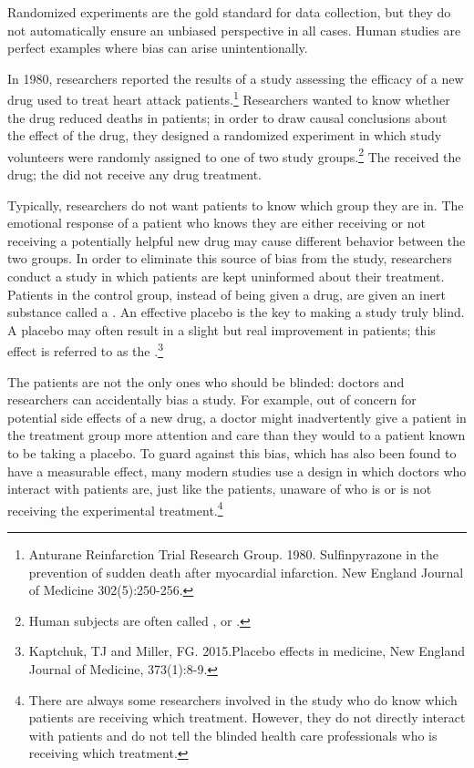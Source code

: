 \begin{doublespace}
Randomized experiments are the gold standard for data collection, but they do not automatically ensure an unbiased perspective in all cases. Human studies are perfect examples where bias can arise unintentionally. 

In 1980, researchers reported the results of a study assessing the efficacy of a new drug used to treat heart attack patients.\footnote{Anturane Reinfarction Trial Research Group. 1980. Sulfinpyrazone in the prevention of sudden death after myocardial infarction. New England Journal of Medicine 302(5):250-256.} Researchers wanted to know whether the drug reduced deaths in patients; in order to draw causal conclusions about the effect of the drug, they designed a randomized experiment in which study volunteers were randomly assigned to one of two study groups.\footnote{Human subjects are often called , or .} The  received the drug; the  did not receive any drug treatment.

Typically, researchers do not want patients to know which group they are in. The emotional response of a patient who knows they are either receiving or not receiving a potentially helpful new drug may cause different behavior between the two groups. In order to eliminate this source of bias from the study, researchers conduct a  study in which patients are kept uninformed about their treatment. Patients in the control group, instead of being given a drug, are given an inert substance called a . An effective placebo is the key to making a study truly blind. A placebo may often result in a slight but real improvement in patients; this effect is referred to as the .\footnote{Kaptchuk, TJ and Miller, FG. 2015.Placebo effects in medicine, New England Journal of Medicine, 373(1):8-9.}

The patients are not the only ones who should be blinded: doctors and researchers can accidentally bias a study. For example, out of concern for potential side effects of a new drug, a doctor might inadvertently give a patient in the treatment group more attention and care than they would to a patient known to be taking a placebo. To guard against this bias, which has also been found to have a measurable effect, many modern studies use a  design in which doctors who interact with patients are, just like the patients, unaware of who is or is not receiving the experimental treatment.\footnote{There are always some researchers involved in the study who do know which patients are receiving which treatment. However, they do not directly interact with patients and do not tell the blinded health care professionals who is receiving which treatment.}


\end{doublespace}

